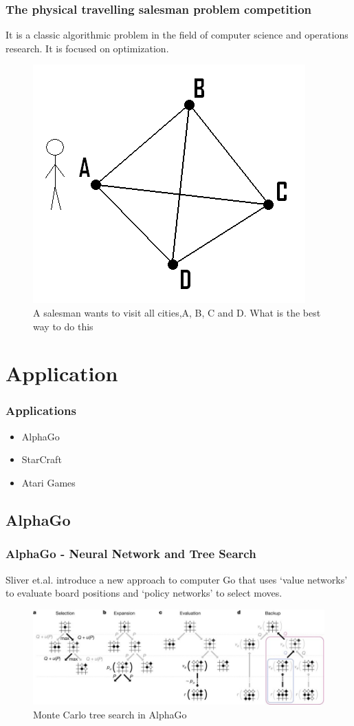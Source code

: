 \documentclass{beamer}
\begin{document}
\begin{frame}
  \frametitle{The physical travelling salesman problem competition\cite{4}}
  It is a classic algorithmic problem in the field of computer science and operations research. It is focused on optimization.
  \begin{figure}
    \includegraphics[width=0.6\linewidth]{figures/salesman}
    \caption{A salesman wants to visit all cities,A, B, C and D. What is the best way to do this}
  \end{figure}
\end{frame}

\section{Application}

\begin{frame}
  \frametitle{Applications}
  \begin{itemize}
    \item AlphaGo
    \item StarCraft
    \item Atari Games
  \end{itemize}
  

\end{frame}
\subsection{AlphaGo}
\begin{frame}
  \frametitle{AlphaGo - Neural Network and Tree Search}
  Sliver et.al. \cite{5} introduce a new approach to computer Go that uses ‘value networks’ to evaluate board positions and ‘policy networks’ to select moves.
  \begin{figure}
    \includegraphics[width=1\linewidth]{figures/gosearch}
    \caption{ Monte Carlo tree search in AlphaGo}
  \end{figure}
\end{frame}
\end{document}
